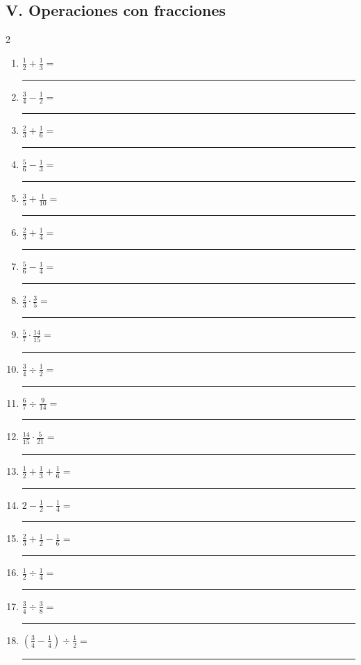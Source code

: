 \documentclass[11pt]{article}
\begin{document}
\subsection*{V. Operaciones con fracciones}
\begin{multicols}{2}\begin{enumerate}[leftmargin=*,start=66]
\item $\displaystyle \frac12+\frac13=$ \rule{2.1cm}{0.4pt}
\item $\displaystyle \frac34-\frac12=$ \rule{2.1cm}{0.4pt}
\item $\displaystyle \frac23+\frac16=$ \rule{2.1cm}{0.4pt}
\item $\displaystyle \frac56-\frac13=$ \rule{2.1cm}{0.4pt}
\item $\displaystyle \frac35+\frac1{10}=$ \rule{2.1cm}{0.4pt}
\item $\displaystyle \frac23+\frac14=$ \rule{2.1cm}{0.4pt}
\item $\displaystyle \frac56-\frac14=$ \rule{2.1cm}{0.4pt}
\item $\displaystyle \frac23\cdot\frac35=$ \rule{2.1cm}{0.4pt}
\item $\displaystyle \frac57\cdot\frac{14}{15}=$ \rule{2.1cm}{0.4pt}
\item $\displaystyle \frac34\div\frac12=$ \rule{2.1cm}{0.4pt}
\item $\displaystyle \frac67\div\frac9{14}=$ \rule{2.1cm}{0.4pt}
\item $\displaystyle \frac{14}{15}\cdot\frac5{21}=$ \rule{2.1cm}{0.4pt}
\item $\displaystyle \frac12+\frac13+\frac16=$ \rule{2.1cm}{0.4pt}
\item $\displaystyle 2-\frac12-\frac14=$ \rule{2.1cm}{0.4pt}
\item $\displaystyle \frac23+\frac12-\frac16=$ \rule{2.1cm}{0.4pt}
\item $\displaystyle \frac12\div\frac14=$ \rule{2.1cm}{0.4pt}
\item $\displaystyle \frac34\div\frac38=$ \rule{2.1cm}{0.4pt}
\item $\displaystyle \left(\frac34-\frac14\right)\div\frac12=$ \rule{2.1cm}{0.4pt}
\end{enumerate}\end{multicols}
\end{document}
